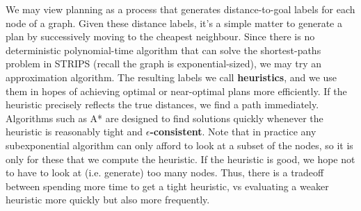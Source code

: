 \documentclass[letterpaper]{article}
\begin{document}
We may view planning as a process that generates distance-to-goal labels for each node of a graph. Given these distance labels, it's a simple matter to generate a plan by successively moving to the cheapest neighbour. Since there is no deterministic polynomial-time algorithm that can solve the shortest-paths problem in STRIPS (recall the graph is exponential-sized), we may try an approximation algorithm. The resulting labels we call \textbf{heuristics}, and we use them in hopes of achieving optimal or near-optimal plans more efficiently. If the heuristic precisely reflects the true distances, we find a path immediately. Algorithms such as A* are designed to find solutions quickly whenever the heuristic is reasonably tight and \textbf{$\epsilon$-consistent}. Note that in practice any subexponential algorithm can only afford to look at a subset of the nodes, so it is only for these that we compute the heuristic. If the heuristic is good, we hope not to have to look at (i.e. generate) too many nodes. Thus, there is a tradeoff between spending more time to get a tight heuristic, vs evaluating a weaker heuristic more quickly but also more frequently.
\end{document}
